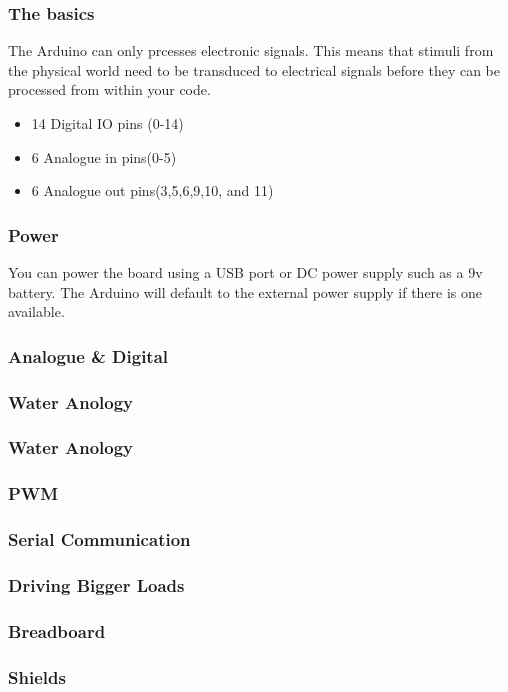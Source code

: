 \begin{frame}
  \frametitle{The basics}  
  The Arduino can only prcesses electronic signals. This means that stimuli from the physical world need to be transduced to electrical signals before they can be processed from within your code. 
  
  \begin{itemize}
    \item 14 Digital IO pins (0-14)
    \item 6 Analogue in pins(0-5)
    \item 6 Analogue out pins(3,5,6,9,10, and 11) ~
  \end{itemize}
\end{frame}

\begin{frame}
  \frametitle{Power}
	You can power the board using a USB port or DC power supply such as a 9v battery. The Arduino will default to the external power supply if there is one available.   
\end{frame}

\begin{frame}
	\frametitle{Analogue \& Digital}
\end{frame}

\begin{frame}
  \frametitle{Water Anology}
\end{frame}

\begin{frame}
  \frametitle{Water Anology}
\end{frame}

\begin{frame}
	\frametitle{PWM}
\end{frame}

\begin{frame}
	\frametitle{Serial Communication}
\end{frame}

\begin{frame}
	\frametitle{Driving Bigger Loads}
\end{frame}

\begin{frame}
	\frametitle{Breadboard}
\end{frame}

\begin{frame}
	\frametitle{Shields}
\end{frame}



